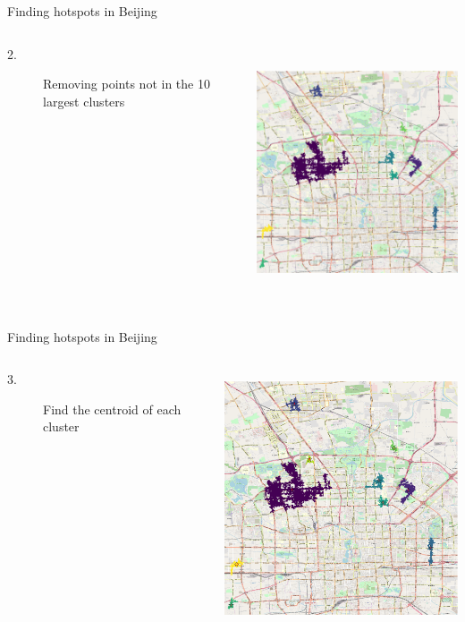 \documentclass[aspectratio=169]{beamer}
\begin{document}
\begin{frame}{Finding hotspots in Beijing}
\begin{columns}
\begin{column}{0.5\textwidth}
\begin{description}
	\item [2.] Removing points not in the 10 largest clusters
\end{description}
\end{column}
\begin{column}{0.5\textwidth}  %
     \centering
	\includegraphics[height=7.5cm]{figures/reduced_map}
\end{column}
\end{columns}
\end{frame}

\begin{frame}{Finding hotspots in Beijing}
\begin{columns}
\begin{column}{0.5\textwidth}
\begin{description}
	\item [3.] Find the centroid of each cluster
\end{description}
\end{column}
\begin{column}{0.5\textwidth}  %
     \centering
	\includegraphics[height=7.5cm]{figures/annotated_map}
\end{column}
\end{columns}
\end{frame}
\end{document}
